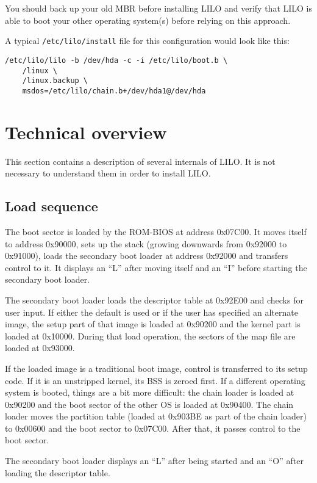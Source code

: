 You should back up your old MBR before installing LILO and verify that
LILO is able to boot your other operating system(s) before relying on
this approach.

A typical {\tt /etc/lilo/install} file for this configuration would look
like this:
\begin{verbatim}
/etc/lilo/lilo -b /dev/hda -c -i /etc/lilo/boot.b \
    /linux \
    /linux.backup \
    msdos=/etc/lilo/chain.b+/dev/hda1@/dev/hda
\end{verbatim}


\section{Technical overview}

This section contains a description of several internals of LILO. It is
not necessary to understand them in order to install LILO.


\subsection{Load sequence}

The boot sector is loaded by the ROM-BIOS at address 0x07C00. It moves
itself to address 0x90000, sets up the stack (growing downwards from
0x92000 to 0x91000), loads the secondary boot loader at address
0x92000 and transfers control to it. It displays an ``L'' after moving
itself and an ``I'' before starting the secondary boot loader.

The secondary boot loader loads the descriptor table at 0x92E00 and checks
for user input. If either the default is used or if the user has specified
an alternate image, the setup part of that image is loaded at 0x90200 and
the kernel part is loaded at 0x10000. During that load operation, the sectors
of the map file are loaded at 0x93000.

If the loaded image is a traditional boot image, control is transferred to
its setup code. If it is an unstripped kernel, its BSS is zeroed first.
If a different operating system is booted, things are a bit more difficult:
the chain loader is loaded at 0x90200 and the boot sector of the other OS
is loaded at 0x90400. The chain loader moves the partition table (loaded at
0x903BE as part of the chain loader) to 0x00600 and the boot sector to
0x07C00. After that, it passes control to the boot sector.

The secondary boot loader displays an ``L'' after being started and an ``O''
after loading the descriptor table.

